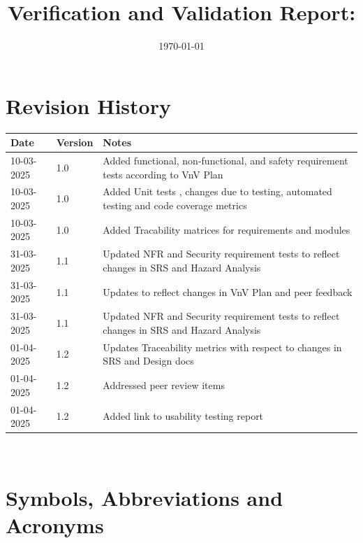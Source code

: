 \documentclass[12pt, titlepage]{article}
\begin{document}
\title{Verification and Validation Report: \progname} 
\author{\authname}
\date{\today}
	
\maketitle


\section{Revision History}

\begin{tabularx}{\textwidth}{p{3cm}p{2cm}X}
\toprule {\bf Date} & {\bf Version} & {\bf Notes}\\
\midrule
10-03-2025 & 1.0 & Added functional, non-functional, and safety requirement tests according to VnV Plan\\
10-03-2025 & 1.0 & Added Unit tests , changes due to testing, automated testing and code coverage metrics\\
10-03-2025 & 1.0 & Added Tracability matrices for requirements and modules\\
31-03-2025 & 1.1 & Updated NFR and Security requirement tests to reflect changes in SRS and Hazard Analysis\\
31-03-2025 & 1.1 & Updates to reflect changes in VnV Plan and peer feedback\\
31-03-2025 & 1.1 & Updated NFR and Security requirement tests to reflect changes in SRS and Hazard Analysis\\
01-04-2025 & 1.2 & Updates Traceability metrics with respect to changes in SRS and Design docs\\
01-04-2025 & 1.2 & Addressed peer review items\\
01-04-2025 & 1.2 & Added link to usability testing report\\

\bottomrule
\end{tabularx}

~\newpage

\section{Symbols, Abbreviations and Acronyms}
\end{document}
